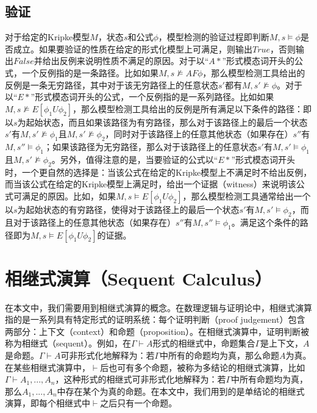 \subsection{验证}
对于给定的Kripke模型$M$，状态$s$和\CTL{}公式$\phi$，\CTL{}模型检测的验证过程即判断$M,s\models \phi$是否成立。如果要验证的性质在给定的形式化模型上可满足，则输出$True$，否则输出$False$并给出反例来说明性质不满足的原因。对于以“$A*$”形式模态词开头的\CTL{}公式，一个反例指的是一条路径。比如如果$M,s\not\models AF\phi$，那么模型检测工具给出的反例是一条无穷路径，其中对于该无穷路径上的任意状态$s'$都有$M,s'\not\models \phi$。对于以“$E*$”形式模态词开头的\CTL{}公式，一个反例指的是一系列路径。比如如果$M,s\not\models E[\phi_1 U\phi_2]$，那么模型检测工具给出的反例是所有满足以下条件的路径：即以$s$为起始状态，而且如果该路径为有穷路径，那么对于该路径上的最后一个状态$s'$有$M,s'\not\models\phi_1$且$M,s'\not\models\phi_2$，同时对于该路径上的任意其他状态（如果存在）$s''$有$M,s''\models \phi_1$；如果该路径为无穷路径，那么对于该路径上的任意状态$s'$有$M,s'\models \phi_1$且$M,s'\not\models \phi_2$。另外，值得注意的是，当要验证的\CTL{}公式以“$E*$”形式模态词开头时，一个更自然的选择是：当该公式在给定的Kripke模型上不满足时不给出反例，而当该公式在给定的Kripke模型上满足时，给出一个证据（witness）来说明该公式可满足的原因\cite{BaierKatoen08}。比如，如果$M,s\models E[\phi_1 U\phi_2]$，那么模型检测工具通常给出一个以$s$为起始状态的有穷路径，使得对于该路径上的最后一个状态$s'$有$M,s'\models\phi_2$，而且对于该路径上的任意其他状态（如果存在）$s''$有$M,s''\models\phi_1$。满足这个条件的路径即为$M,s\models E[\phi_1 U\phi_2]$的证据。


\section{相继式演算（Sequent Calculus）}
在本文中，我们需要用到相继式演算的概念。在数理逻辑与证明论中，相继式演算指的是一系列具有特定形式的证明系统：每个证明判断（proof judgement）包含两部分：上下文（context）和命题（proposition）。在相继式演算中，证明判断被称为相继式（sequent）。例如，在$\Gamma\vdash A$形式的相继式中，命题集合$\Gamma$是上下文，$A$是命题。$\Gamma\vdash A$可非形式化地解释为：若$\Gamma$中所有的命题均为真，那么命题$A$为真。
在某些相继式演算中，$\vdash$后也可有多个命题，被称为多结论的相继式演算，比如$\Gamma\vdash A_1,...,A_n$，这种形式的相继式可非形式化地解释为：若$\Gamma$中所有命题均为真，那么$A_1,...,A_n$中存在某个为真的命题。在本文中，我们用到的是单结论的相继式演算，即每个相继式中$\vdash$之后只有一个命题。

